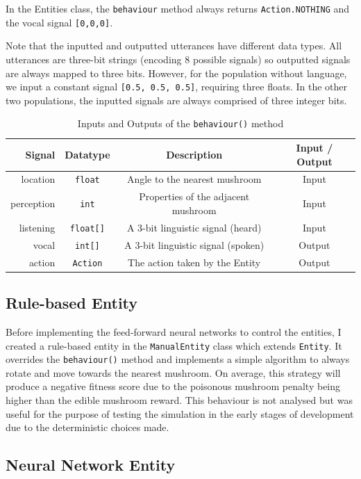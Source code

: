\documentclass[12pt,a4paper,twoside,openright]{report}
\begin{document}
In the Entities class, the \texttt{behaviour} method always returns \texttt{Action.NOTHING} and the vocal signal \texttt{[0,0,0]}.

Note that the inputted and outputted utterances have different data types. All utterances are three-bit strings (encoding 8 possible signals) so outputted signals are always mapped to three bits. However, for the population without language, we input a constant signal \texttt{[0.5, 0.5, 0.5]}, requiring three floats. In the other two populations, the inputted  signals are always comprised of three integer bits.

\begin{table}[t]
\centering
 \begin{tabular}{ r | c | c | c}
 \bf{Signal} & \bf{Datatype} & \bf{Description} & \bf{Input / Output} \\ [0.5ex] 
 \hline
location & \texttt{float} & Angle to the nearest mushroom & Input \\
perception & \texttt{int} & Properties of the adjacent mushroom & Input \\
listening & \texttt{float[]} & A 3-bit linguistic signal (heard) & Input \\
vocal & \texttt{int[]} & A 3-bit linguistic signal (spoken) & Output \\
action & \texttt{Action} & The action taken by the Entity & Output \\
\end{tabular}
\caption{Inputs and Outputs of the \texttt{behaviour()} method}
\label{table:behaviour}
\end{table}

\subsection{Rule-based Entity}

Before implementing the feed-forward neural networks to control the entities, I created a rule-based entity in the \texttt{ManualEntity} class which extends \texttt{Entity}. It overrides the \texttt{behaviour()} method and implements a simple algorithm to always rotate and move towards the nearest mushroom. On average, this strategy will produce a negative fitness score due to the poisonous mushroom penalty being higher than the edible mushroom reward. This behaviour is not analysed but was useful for the purpose of testing the simulation in the early stages of development due to the deterministic choices made.

\subsection{Neural Network Entity}
\end{document}
